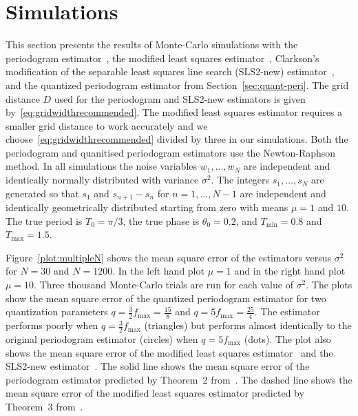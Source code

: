 \documentclass[10pt,twocolumn,twoside]{IEEEtran}
\begin{document}
\section{Simulations} \label{sec:simulations}

This section presents the results of Monte-Carlo simulations with the periodogram estimator~\cite{Haohuan2013435,Fogel1989_bit_synch_zero_crossings}, the modified least squares estimator~\cite{Clarkson2007,McKilliam2007,Quinn_sparse_noisy_SSP_2012}, Clarkson's modification of the separable least squares line search (SLS2-new) estimator~\cite{Clarkson2007,Sidiropoulos2005}, and the quantized periodogram estimator from Section~\ref{sec:quant-peri}.  The grid distance $D$ used for the periodogram and SLS2-new estimators is given by~\eqref{eq:gridwidthrecommended}.  The modified least squares estimator requires a smaller grid distance to work accurately and we choose~\eqref{eq:gridwidthrecommended} divided by three in our simulations.  %
Both the periodogram and quanitised periodogram estimators use the Newton-Raphson method.  In all simulations the noise variables $w_1,\dots,w_N$ are independent and identically normally distributed with variance $\sigma^2$.  The integers $s_1,\dots,s_N$ are generated so that $s_1$ and $s_{n+1} - s_n$ for $n=1,\dots,N-1$ are independent and identically geometrically distributed starting from zero with means $\mu=1$ and $10$.  The true period is $T_0 = \pi/3$, the true phase is $\theta_0 = 0.2$, and $T_{\text{min}} = 0.8$ and $T_{\text{max}} = 1.5$.

Figure~\ref{plot:multipleN} shows the mean square error of the estimators versus $\sigma^2$ for $N = 30$ and $N = 1200$.  In the left hand  plot $\mu=1$ and in the right hand plot $\mu=10$.  %
Three thousand Monte-Carlo trials are run for each value of $\sigma^2$.  The plots show the mean square error of the quantized periodogram estimator for two quantization parameters $q = \tfrac{3}{2}f_{\text{max}} = \tfrac{15}{8}$ and $q = 5 f_{\text{max}} = \tfrac{25}{4}$.  The estimator performs poorly when $q = \tfrac{3}{2}f_{\text{max}}$ (triangles) but performs almost identically to the original periodogram estimator (circles) when $q = 5 f_{\text{max}}$ (dots).  The plot also shows the mean square error of the modified least squares estimator~\cite{Clarkson2007,McKilliam2007} and the SLS2-new estimator~\cite{Clarkson2007,Sidiropoulos2005}.  %
The solid line shows the mean square error of the periodogram estimator predicted by Theorem~2 from~\cite{Quinn20013asilomar_period_est}.  The dashed line shows the mean square error of the modified least squares estimator predicted by Theorem~3 from~\cite{Quinn_sparse_noisy_SSP_2012}.
\end{document}
